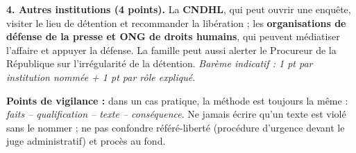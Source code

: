 \documentclass[11pt]{article}
\begin{document}
\begin{corrige}
\textbf{4. Autres institutions (4 points).} La \textbf{CNDHL}, qui peut ouvrir une enquête, visiter le lieu de détention et recommander la libération ; les \textbf{organisations de défense de la presse et ONG de droits humains}, qui peuvent médiatiser l'affaire et appuyer la défense. La famille peut aussi alerter le Procureur de la République sur l'irrégularité de la détention. \emph{Barème indicatif : 1 pt par institution nommée + 1 pt par rôle expliqué.}

\textbf{Points de vigilance :} dans un cas pratique, la méthode est toujours la même : \emph{faits -- qualification -- texte -- conséquence}. Ne jamais écrire qu'un texte est violé sans le nommer ; ne pas confondre référé-liberté (procédure d'urgence devant le juge administratif) et procès au fond.
\end{corrige}
\end{document}
